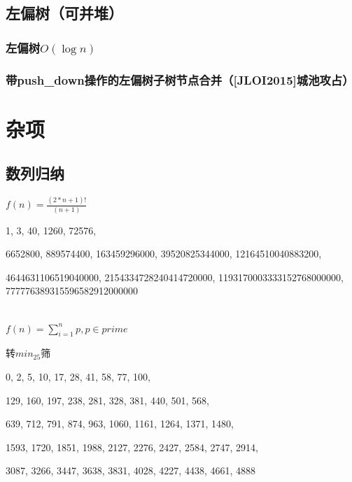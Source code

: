 \documentclass[landscape,twocolumn,twoside,a4paper]{article}
\begin{document}
\subsection{左偏树（可并堆）}

\subsubsection{左偏树$O(\log n)$}


\subsubsection{带push\_down操作的左偏树子树节点合并（[JLOI2015]城池攻占）}



\section{杂项}

\subsection{数列归纳}

$f(n) = \frac{(2*n + 1)!}{(n + 1)}$\par
1, 3, 40, 1260, 72576, \par
6652800, 889574400, 163459296000, 39520825344000, 12164510040883200, \par
4644631106519040000, 2154334728240414720000, 1193170003333152768000000, 777776389315596582912000000\par

~\\

$f(n) = \sum_{i=1}^{n} p, p \in prime$\par
转$min_25筛$\par
0, 2, 5, 10, 17, 28, 41, 58, 77, 100, \par
129, 160, 197, 238, 281, 328, 381, 440, 501, 568, \par
639, 712, 791, 874, 963, 1060, 1161, 1264, 1371, 1480, \par
1593, 1720, 1851, 1988, 2127, 2276, 2427, 2584, 2747, 2914, \par
3087, 3266, 3447, 3638, 3831, 4028, 4227, 4438, 4661, 4888\par
\par
\end{document}
